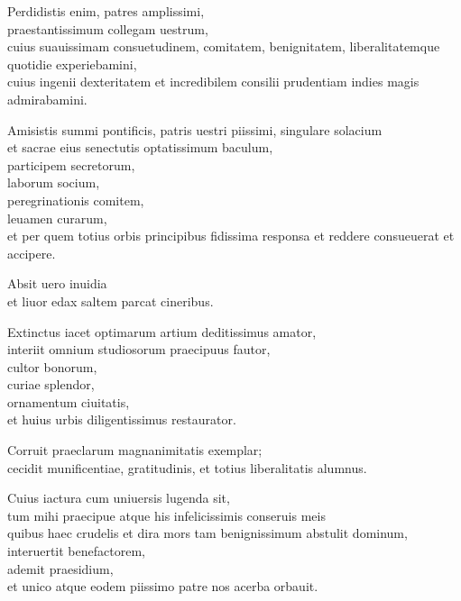 \documentclass[a5paper,twoside]{article}
\begin{document}
Perdidistis enim, patres amplissimi, \\
praestantissimum collegam uestrum, \\
cuius suauissimam consuetudinem, comitatem, benignitatem, liberalitatemque quotidie experiebamini, \\
cuius ingenii dexteritatem et incredibilem consilii prudentiam indies magis admirabamini. 

Amisistis summi pontificis, patris uestri piissimi, singulare solacium \\
et sacrae eius senectutis optatissimum baculum, \\
participem secretorum, \\
laborum socium, \\
peregrinationis comitem, \\
leuamen curarum, \\
et per quem totius orbis principibus fidissima responsa et reddere consueuerat et accipere. 

Absit uero inuidia \\
et liuor edax saltem parcat cineribus.

Extinctus iacet optimarum artium deditissimus amator, \\
interiit omnium studiosorum praecipuus fautor, \\
cultor bonorum, \\
curiae splendor, \\
ornamentum ciuitatis, \\
et huius urbis diligentissimus restaurator. 

Corruit praeclarum magnanimitatis exemplar; \\
cecidit munificentiae, gratitudinis, et totius liberalitatis alumnus. 

Cuius iactura cum uniuersis lugenda sit, \\
tum mihi praecipue atque his infelicissimis conseruis meis \\
quibus haec crudelis et dira mors tam benignissimum abstulit dominum, \\
interuertit benefactorem, \\
ademit praesidium, \\
et unico atque eodem piissimo patre nos acerba orbauit. 
\end{document}

